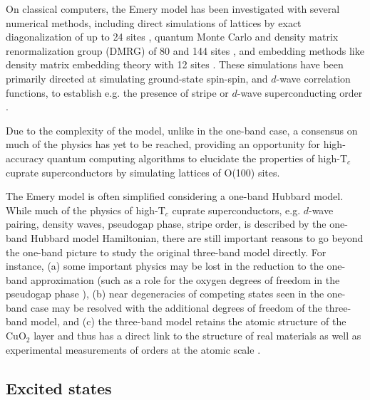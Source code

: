 On classical computers, the Emery model has been investigated with several numerical methods, including direct simulations of lattices by exact diagonalization of up to 24 sites \cite{greiter2007no}, 
quantum Monte Carlo and density matrix renormalization group (DMRG) of 80 and 144 sites \cite{huang2017numerical,vitali2019metal}, and embedding methods like density matrix embedding theory with 12 sites \cite{cui2020ground}.
These simulations have been primarily directed at simulating ground-state spin-spin, and $d$-wave correlation functions, to establish e.g. the presence of stripe or $d$-wave superconducting order \cite{greiter2007no,huang2017numerical,vitali2019metal,cui2020ground}.

Due to the complexity of the model, unlike in the one-band case, a consensus on much of the physics has yet to be reached, 
providing an opportunity for high-accuracy quantum computing algorithms to elucidate the properties of high-T$_c$ cuprate superconductors by simulating lattices of O(100) sites.

The Emery model is often simplified considering a one-band Hubbard model. While much of the physics of high-T$_c$ cuprate superconductors,
e.g. $d$-wave pairing, density waves, pseudogap phase, stripe order, is described by the one-band Hubbard model Hamiltonian,  there are still important reasons to go beyond the one-band picture to study the original three-band model directly. For instance, (a) some important physics may be lost in the reduction to the one-band approximation (such as a role for the oxygen degrees of freedom in the pseudogap phase \cite{fauque2006magnetic}), (b) near degeneracies of competing states seen in the one-band case \cite{zheng2017stripe} may be resolved with the additional degrees of freedom of the three-band model, and (c) the three-band model retains the atomic structure of the CuO$_2$ layer and thus has a direct link to the structure of real materials as well as experimental measurements of orders at the atomic scale \cite{hybertsen1989calculation,martin1996electronic,hanke20103}.

\subsection{Excited states}

